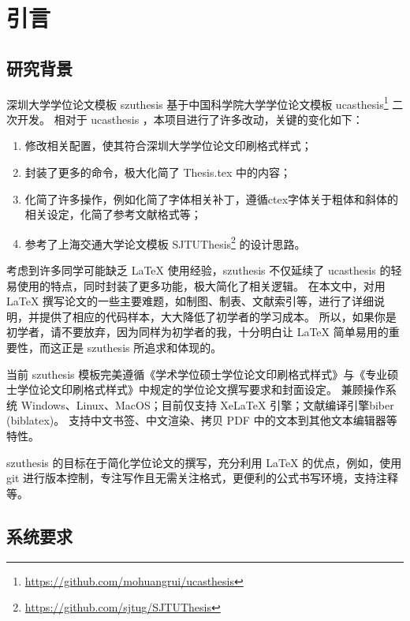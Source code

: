 \chapter{引言}\label{chap:intro}

\section{研究背景}\label{sec:background}

深圳大学学位论文模板 szuthesis 基于中国科学院大学学位论文模板 ucasthesis\footnote{\url{https://github.com/mohuangrui/ucasthesis}} 二次开发。
相对于 ucasthesis ，本项目进行了许多改动，关键的变化如下：

\begin{enumerate}[wide=\parindent]
    \item 修改相关配置，使其符合深圳大学学位论文印刷格式样式；
    \item 封装了更多的命令，极大化简了 Thesis.tex 中的内容；
    \item 化简了许多操作，例如化简了字体相关补丁，遵循ctex字体关于粗体和斜体的相关设定，化简了参考文献格式等；
    \item 参考了上海交通大学论文模板 SJTUThesis\footnote{\url{https://github.com/sjtug/SJTUThesis}} 的设计思路。
\end{enumerate}

考虑到许多同学可能缺乏 \LaTeX{} 使用经验，szuthesis 不仅延续了 ucasthesis 的轻易使用的特点，同时封装了更多功能，极大简化了相关逻辑。
在本文中，对用 \LaTeX{} 撰写论文的一些主要难题，如制图、制表、文献索引等，进行了详细说明，并提供了相应的代码样本，大大降低了初学者的学习成本。
所以，如果你是初学者，请不要放弃，因为同样为初学者的我，十分明白让 \LaTeX{} 简单易用的重要性，而这正是 szuthesis 所追求和体现的。

当前 szuthesis 模板完美遵循《学术学位硕士学位论文印刷格式样式》与《专业硕士学位论文印刷格式样式》中规定的学位论文撰写要求和封面设定。
兼顾操作系统 Windows、Linux、MacOS；目前仅支持 Xe\LaTeX{} 引擎；文献编译引擎biber (biblatex)。
支持中文书签、中文渲染、拷贝 PDF 中的文本到其他文本编辑器等特性。

szuthesis 的目标在于简化学位论文的撰写，充分利用 \LaTeX{} 的优点，例如，使用 git 进行版本控制，专注写作且无需关注格式，更便利的公式书写环境，支持注释等。


\section{系统要求}\label{sec:system}

